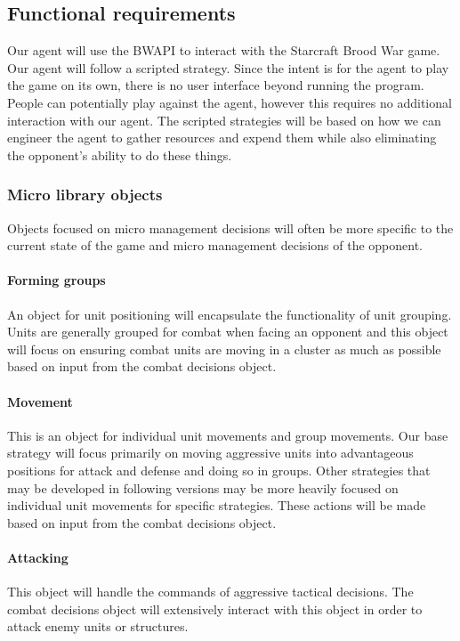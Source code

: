 \documentclass[10pt,letterpaper,onecolumn,draftclsnofoot]{IEEEtran}
\begin{document}
\subsection{Functional requirements}
Our agent will use the BWAPI to interact with the Starcraft Brood War game. Our agent will follow a scripted strategy. Since the intent is for the agent to play the game on its own, there is no user interface beyond running the program. People can potentially play against the agent, however this requires no additional interaction with our agent. The scripted strategies will be based on how we can engineer the agent to gather resources and expend them while also eliminating the opponent's ability to do these things.

\subsubsection{Micro library objects}
Objects focused on micro management decisions will often be more specific to the current state of the game and micro management decisions of the opponent.

\paragraph{Forming groups}
An object for unit positioning will encapsulate the functionality of unit grouping. Units are generally grouped for combat when facing an opponent and this object will focus on ensuring combat units are moving in a cluster as much as possible based on input from the combat decisions object. 

\paragraph{Movement}
This is an object for individual unit movements and group movements. Our base strategy will focus primarily on moving aggressive units into advantageous positions for attack and defense and doing so in groups. Other strategies that may be developed in following versions may be more heavily focused on individual unit movements for specific strategies. These actions will be made based on input from the combat decisions object.

\paragraph{Attacking}
This object will handle the commands of aggressive tactical decisions. The combat decisions object will extensively interact with this object in order to attack enemy units or structures. 
\end{document}
